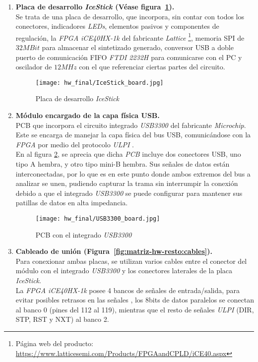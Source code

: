 \begin{enumerate}
    \item \textbf{Placa de desarrollo \emph{IceStick \cite{icestickmanual}} (Véase figura~\ref{fig:IceStick_board}).} \\
    Se trata de una placa de desarrollo, que incorpora, sin contar con todos los conectores, indicadores \emph{LEDs}, elementos pasivos y componentes de regulación, la \emph{FPGA iCE40HX-1k \cite{lattice:ice40}} del fabricante \emph{Lattice} \footnote{Página web del producto: \url{https://www.latticesemi.com/Products/FPGAandCPLD/iCE40.aspx}}, memoria SPI de $32MBit$ para almacenar el sintetizado generado, conversor USB a doble puerto de comunicación FIFO \emph{FTDI 2232H \cite{FTDI:FT2232HL}} para comunicarse con el PC y oscilador de $12MHz$ con el que referenciar ciertas partes del circuito.
    
    \begin{figure}[htbp]
        \centering
        \texttt{[image: hw\_final/IceStick\_board.jpg]}
        \caption{Placa de desarrollo \emph{IceStick}}
        \label{fig:IceStick_board}
    \end{figure}

    \item \textbf{Módulo encargado de la capa física USB.} \\
    PCB que incorpora el circuito integrado \emph{USB3300 \cite{icestickmanual}} del fabricante \emph{Microchip}. Este se encarga de manejar la capa física del bus USB, comunicándose con la \emph{FPGA} por medio del protocolo \emph{ULPI} \cite{ulpi-specs}. \\
    En al figura \ref{fig:USB3300_board}, se aprecia que dicha \emph{PCB} incluye dos conectores USB, uno tipo A hembra, y otro tipo mini-B hembra. Sus señales de datos están interconectadas, por lo que es en este punto donde ambos extremos del bus a analizar se unen, pudiendo capturar la trama sin interrumpir la conexión debido a que el integrado \emph{USB3300} se puede configurar para mantener sus patillas de datos en alta impedancia.

    \begin{figure}[htbp]
        \centering
        \texttt{[image: hw\_final/USB3300\_board.jpg]}
        \caption{PCB con el integrado \emph{USB3300}}
        \label{fig:USB3300_board}
    \end{figure}

    \item \textbf{Cableado de unión (Figura~\ref{fig:matriz-hw-resto:cables}).} \\
    Para conexionar ambas placas, se utilizan varios cables entre el conector del módulo con el integrado \emph{USB3300} y los conectores laterales de la placa \emph{IceStick}. \\
    La \emph{FPGA iCE40HX-1k} posee 4 bancos de señales de entrada/salida, para evitar posibles retrasos en las señales \cite{fpga:routing}, los 8bits de datos paralelos se conectan al banco 0 (pines del 112 al 119), mientras que el resto de señales \emph{ULPI} (DIR, STP, RST y NXT) al banco 2.


\end{enumerate}
